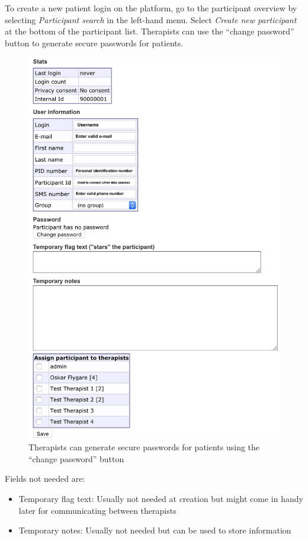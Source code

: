 \documentclass[]{book}
\providecommand{\tightlist}{%
  \setlength{\itemsep}{0pt}\setlength{\parskip}{0pt}}
\begin{document}
To create a new patient login on the platform, go to the participant overview by selecting \emph{Participant search} in the left-hand menu. Select \emph{Create new participant} at the bottom of the participant list. Therapists can use the ``change password'' button to generate secure passwords for patients.

\begin{figure}
\centering
\includegraphics{images/new-participant.png}
\caption{Therapists can generate secure passwords for patients using the ``change password'' button}
\end{figure}

Fields not needed are:

\begin{itemize}
\tightlist
\item
  Temporary flag text: Usually not needed at creation but might come in handy later for communicating between therapists
\item
  Temporary notes: Usually not needed but can be used to store information
\end{itemize}
\end{document}
